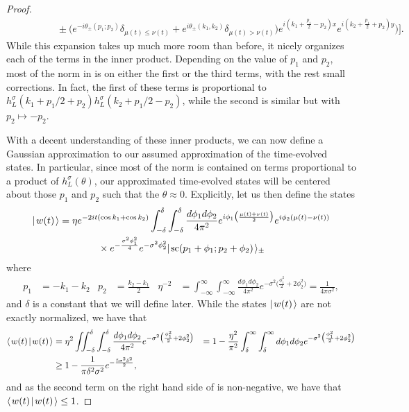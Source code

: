 \documentclass[../thesis-main/thesis-main]{subfiles}
\begin{document}
\begin{proof}
\begin{align}
  &\qquad\qquad \pm \Big(e^{-i\theta_{\pm}(p_1;p_2)}\delta_{\mu(t)\leq\nu(t)} + e^{i  \theta_{\pm}(k_1,k_2)}\delta_{\mu(t) > \nu(t)}\Big) e^{i (k_1 + \frac{p_1}{2} - p_2)x}e^{i(k_2 + \frac{p_1}{2} + p_2)y}\bigg)\Bigg].\label{eq:alpha_scat_ip}
\end{align}
While this expansion takes up much more room than before, it nicely organizes each of the terms in the inner product.  Depending on the value of $p_1$ and $p_2$, most of the norm in  is on either the first or the third terms, with the rest small corrections.  In fact, the first of these terms is proportional to $h_{L}^\sigma (k_1+p_1/2 + p_2) h_L^\sigma(k_2+p_1/2- p_2)$, while the second is similar but with $p_2\mapsto -p_2$.

With a decent understanding of these inner products, we can now define a Gaussian approximation to our assumed approximation of the time-evolved states.  In particular, since most of the norm is contained on terms proportional to a product of $h_L^\sigma(\theta)$, our approximated time-evolved states will be centered about those $p_1$ and $p_2$ such that the $\theta \approx 0$.  Explicitly, let us then define the states
\begin{align}
  |\mspace{2mu} w(t) \mspace{2mu} \rangle &= \eta e^{ - 2 i t (\cos k_1 + \cos k_2)} \int_{-\delta}^\delta \int_{-\delta}^\delta \frac{d\phi_1 d\phi_2}{4\pi^2} e^{i \phi_1 \big(\frac{\mu(t) + \nu(t)}{2}\big)} e^{i  \phi_2 (\mu(t) - \nu(t))} \nonumber\\
  &\qquad\qquad \times e^{ -\frac{ \sigma^2 \phi_1^2}{4}} e^{ -\sigma^2 \phi_2^2} |\mspace{2mu} \text{sc}(p_1 + \phi_1; p_2 + \phi_2) \mspace{2mu} \rangle_{\pm}
\end{align} 
where
\begin{align}
p_1 &= - k_1 - k_2 & p_2 & = \frac{k_2 - k_1}{2} &
  \eta^{-2} &= \int_{-\infty}^\infty \int_{-\infty}^\infty \frac{d\phi_1 d\phi_2}{4\pi^2} e^{ -\sigma^2 \big(\frac{\phi_1^2}{2} + 2 \phi_2^2 \big)} = \frac{1}{4\pi\sigma^2},
\end{align}
and $\delta$ is a constant that we will define later.  While the states $|\mspace{2mu} w(t) \mspace{2mu} \rangle$ are not exactly normalized, we have that
\begin{align}
   \langle\mspace{2mu} w(t) \mspace{2mu} | \mspace{2mu} w(t)\mspace{2mu} \rangle &= \eta^2 \iint_{-\delta}^\delta \int_{-\delta}^\delta \frac{d\phi_1d\phi_2}{4\pi^2}  e^{ -\sigma^2 \big(\frac{\phi_1^2}{2} + 2 \phi_2^2 \big)} &= 1  - \frac{\eta^2}{\pi^2} \int_\delta^{\infty} \int_{\delta}^\infty d\phi_1d\phi_2 e^{ - \sigma^2 \big(\frac{\phi_1^2}{2} + 2 \phi_2^2\big)}\label{eq:w_norm}\\
   & \geq  1 - \frac{1}{\pi \delta^2 \sigma^2}e^{- \frac{5 \sigma^2 \delta^2}{2}},
\end{align}
and as the second term on the right hand side of  is non-negative, we have that $\langle\mspace{2mu} w(t) \mspace{2mu} | \mspace{2mu} w(t)\mspace{2mu} \rangle \leq 1$.


\end{proof}
\end{document}
